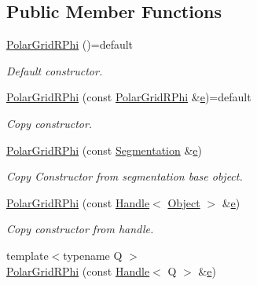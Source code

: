 \subsection*{Public Member Functions}
\begin{DoxyCompactItemize}
\item 
\hyperlink{class_d_d4hep_1_1_geometry_1_1_polar_grid_r_phi_a8a93298d411aebf8b158a2f9537a600b}{Polar\+Grid\+R\+Phi} ()=default
\begin{DoxyCompactList}\small\item\em Default constructor. \end{DoxyCompactList}\item 
\hyperlink{class_d_d4hep_1_1_geometry_1_1_polar_grid_r_phi_a2a250d17ac89e45e097b1e9f6e740f1f}{Polar\+Grid\+R\+Phi} (const \hyperlink{class_d_d4hep_1_1_geometry_1_1_polar_grid_r_phi}{Polar\+Grid\+R\+Phi} \&\hyperlink{_volumes_8cpp_a8a9a1f93e9b09afccaec215310e64142}{e})=default
\begin{DoxyCompactList}\small\item\em Copy constructor. \end{DoxyCompactList}\item 
\hyperlink{class_d_d4hep_1_1_geometry_1_1_polar_grid_r_phi_aec8a817c925fdd0146eaf53c612e32e4}{Polar\+Grid\+R\+Phi} (const \hyperlink{class_d_d4hep_1_1_geometry_1_1_segmentation}{Segmentation} \&\hyperlink{_volumes_8cpp_a8a9a1f93e9b09afccaec215310e64142}{e})
\begin{DoxyCompactList}\small\item\em Copy Constructor from segmentation base object. \end{DoxyCompactList}\item 
\hyperlink{class_d_d4hep_1_1_geometry_1_1_polar_grid_r_phi_ab27807b9812126c2574356c71dee5c15}{Polar\+Grid\+R\+Phi} (const \hyperlink{class_d_d4hep_1_1_handle}{Handle}$<$ \hyperlink{class_d_d4hep_1_1_geometry_1_1_polar_grid_r_phi_aebd15faef8872b8331cb2a153d5665bd}{Object} $>$ \&\hyperlink{_volumes_8cpp_a8a9a1f93e9b09afccaec215310e64142}{e})
\begin{DoxyCompactList}\small\item\em Copy constructor from handle. \end{DoxyCompactList}\item 
{\footnotesize template$<$typename Q $>$ }\\\hyperlink{class_d_d4hep_1_1_geometry_1_1_polar_grid_r_phi_a90c016871d04987c3dcbfcc11cf5dcaa}{Polar\+Grid\+R\+Phi} (const \hyperlink{class_d_d4hep_1_1_handle}{Handle}$<$ Q $>$ \&\hyperlink{_volumes_8cpp_a8a9a1f93e9b09afccaec215310e64142}{e})

\end{DoxyCompactItemize}
